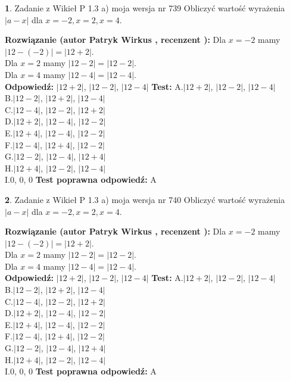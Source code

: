 \documentclass[12pt, a4paper]{article}
\theoremstyle{definition} %
\newtheorem{zad}{}
\newcommand{\zadStart}[1]{\begin{zad}#1\newline}
\newcommand{\zadStop}{\end{zad}}
\newcommand{\rozwStart}[2]{\noindent \textbf{Rozwiązanie (autor #1 , recenzent #2): }\newline}
\newcommand{\rozwStop}{\newline}
\newcommand{\odpStart}{\noindent \textbf{Odpowiedź:}\newline}
\newcommand{\odpStop}{\newline}
\newcommand{\testStart}{\noindent \textbf{Test:}\newline}
\newcommand{\testStop}{\newline}
\newcommand{\kluczStart}{\noindent \textbf{Test poprawna odpowiedź:}\newline}
\newcommand{\kluczStop}{\newline}
\begin{document}
\zadStart{Zadanie z Wikieł P 1.3 a) moja wersja nr 739}
Obliczyć wartość wyrażenia $|a - x|$ dla $x=-2,x=2,x=4$.
\zadStop
\rozwStart{Patryk Wirkus}{}
Dla $x = -2$ mamy $|12 - (-2)| = |12 + 2|$.\\
Dla $x = 2$ mamy $|12 - 2| = |12 - 2|$.\\
Dla $x = 4$ mamy $|12 - 4| = |12 - 4|$.\\
\rozwStop
\odpStart
$|12 + 2|$, $|12 - 2|$, $|12 - 4|$
\odpStop
\testStart
A.$|12 + 2|$, $|12 - 2|$, $|12 - 4|$\\
B.$|12 - 2|$, $|12 + 2|$, $|12 - 4|$\\
C.$|12 - 4|$, $|12 - 2|$, $|12 + 2|$\\
D.$|12 + 2|$, $|12 - 4|$, $|12 - 2|$\\
E.$|12 + 4|$, $|12 - 4|$, $|12 - 2|$\\
F.$|12 - 4|$, $|12 + 4|$, $|12 - 2|$\\
G.$|12 - 2|$, $|12 - 4|$, $|12 + 4|$\\
H.$|12 + 4|$, $|12 - 2|$, $|12 - 4|$\\
I.$0$, $0$, $0$
\testStop
\kluczStart
A
\kluczStop



\zadStart{Zadanie z Wikieł P 1.3 a) moja wersja nr 740}
Obliczyć wartość wyrażenia $|a - x|$ dla $x=-2,x=2,x=4$.
\zadStop
\rozwStart{Patryk Wirkus}{}
Dla $x = -2$ mamy $|12 - (-2)| = |12 + 2|$.\\
Dla $x = 2$ mamy $|12 - 2| = |12 - 2|$.\\
Dla $x = 4$ mamy $|12 - 4| = |12 - 4|$.\\
\rozwStop
\odpStart
$|12 + 2|$, $|12 - 2|$, $|12 - 4|$
\odpStop
\testStart
A.$|12 + 2|$, $|12 - 2|$, $|12 - 4|$\\
B.$|12 - 2|$, $|12 + 2|$, $|12 - 4|$\\
C.$|12 - 4|$, $|12 - 2|$, $|12 + 2|$\\
D.$|12 + 2|$, $|12 - 4|$, $|12 - 2|$\\
E.$|12 + 4|$, $|12 - 4|$, $|12 - 2|$\\
F.$|12 - 4|$, $|12 + 4|$, $|12 - 2|$\\
G.$|12 - 2|$, $|12 - 4|$, $|12 + 4|$\\
H.$|12 + 4|$, $|12 - 2|$, $|12 - 4|$\\
I.$0$, $0$, $0$
\testStop
\kluczStart
A
\kluczStop
\end{document}

